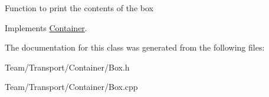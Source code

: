 Function to print the contents of the box 

Implements \hyperlink{classContainer_a0056752dea3f0d49dc085b0284d86ec5}{Container}.



The documentation for this class was generated from the following files\+:\begin{DoxyCompactItemize}
\item 
Team/\+Transport/\+Container/Box.\+h\item 
Team/\+Transport/\+Container/Box.\+cpp\end{DoxyCompactItemize}
